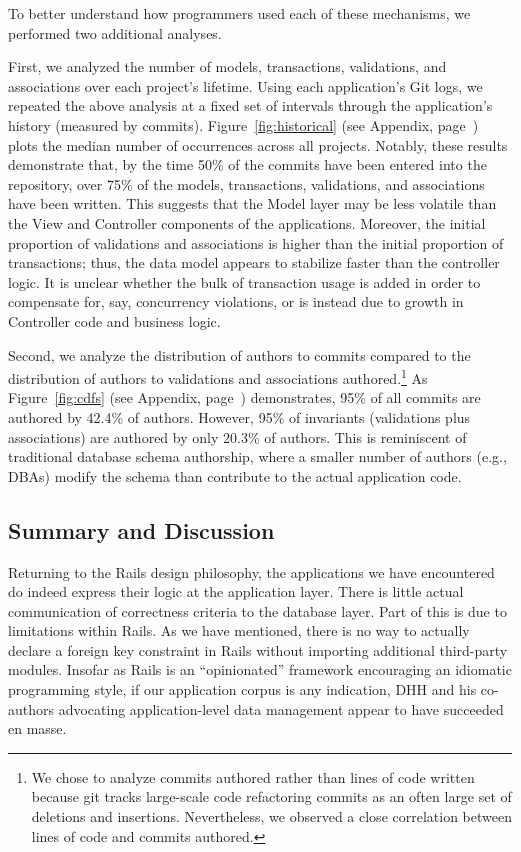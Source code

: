  To better understand how programmers
used each of these mechanisms, we performed two additional
analyses.

First, we analyzed the number of models, transactions, validations,
and associations over each project's lifetime. Using each
application's Git logs, we repeated the above analysis at a fixed set
of intervals through the application's history (measured by
commits). Figure~\ref{fig:historical} (see Appendix, page~\pageref{fig:historical}) plots the median number of
occurrences across all projects. Notably, these results demonstrate
that, by the time 50\% of the commits have been entered into the
repository, over 75\% of the models, transactions, validations, and
associations have been written. This suggests that the Model layer may
be less volatile than the View and Controller components of the
applications. Moreover, the initial proportion of validations and
associations is higher than the initial proportion of transactions;
thus, the data model appears to stabilize faster than the controller
logic. It is unclear whether the bulk of transaction usage is added in
order to compensate for, say, concurrency violations, or is instead
due to growth in Controller code and business logic.


Second, we analyze the distribution of authors to commits compared to
the distribution of authors to validations and associations
authored.\footnote{We chose to analyze commits authored rather than
  lines of code written because git tracks large-scale code
  refactoring commits as an often large set of deletions and
  insertions. Nevertheless, we observed a close correlation between
  lines of code and commits authored.} As Figure~\ref{fig:cdfs} (see
Appendix, page~\pageref{fig:cdfs}) demonstrates, 95\% of all commits are authored by 42.4\% of
authors. However, 95\% of invariants (validations plus associations)
are authored by only 20.3\% of authors. This is reminiscent of
traditional database schema authorship, where a smaller number of
authors (e.g., DBAs) modify the schema than contribute to the actual
application code.


\subsection{Summary and Discussion}

Returning to the Rails design philosophy, the applications we have
encountered do indeed express their logic at the application
layer. There is little actual communication of correctness criteria to
the database layer. Part of this is due to limitations within
Rails. As we have mentioned, there is no way to actually declare a
foreign key constraint in Rails without importing additional
third-party modules. Insofar as Rails is an ``opinionated'' framework
encouraging an idiomatic programming style, if our application corpus
is any indication, DHH and his co-authors advocating application-level
data management appear to have succeeded en masse.

